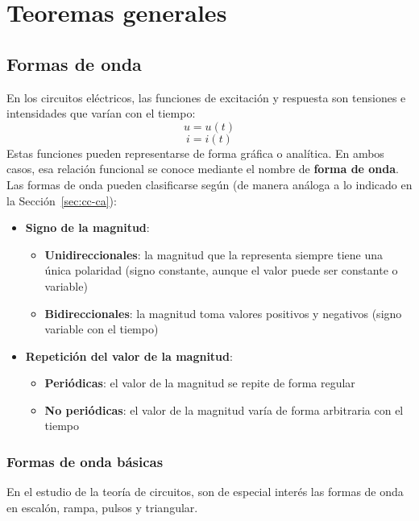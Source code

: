 \chapter{Teoremas generales}\label{chap:teoremas}

\section{Formas de onda}
	
En los circuitos eléctricos, las funciones de excitación y respuesta
son tensiones e intensidades que varían con el tiempo:
\begin{equation*}
  u=u(t)
\end{equation*}
\begin{equation*}
  i=i(t)
\end{equation*}
Estas funciones pueden representarse de forma gráfica o analítica. En
ambos casos, esa relación funcional se conoce mediante el nombre de
\textbf{forma de onda}. Las formas de onda pueden clasificarse según
(de manera análoga a lo indicado en la Sección~\ref{sec:cc-ca}):
\begin{itemize}
\item \textbf{Signo de la magnitud}:
  \begin{itemize}
  \item \textbf{Unidireccionales}: la magnitud que la representa
    siempre tiene una única polaridad (signo constante, aunque el
    valor puede ser constante o variable)
  \item \textbf{Bidireccionales}: la magnitud toma valores positivos y
    negativos (signo variable con el tiempo)
  \end{itemize}
\item \textbf{Repetición del valor de la magnitud}:
  \begin{itemize}
  \item \textbf{Periódicas}: el valor de la magnitud se repite de
    forma regular
  \item \textbf{No periódicas}: el valor de la magnitud varía de forma
    arbitraria con el tiempo
  \end{itemize}
\end{itemize}

\subsection{Formas de onda básicas}
En el estudio de la teoría de circuitos, son de especial interés las
formas de onda en escalón, rampa, pulsos y triangular.
	
